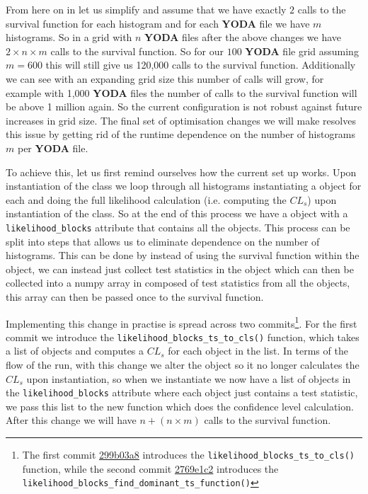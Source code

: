 From here on in let us simplify and assume that we have exactly $2$ calls to the survival function for each histogram and for each \textbf{YODA} file we have $m$ histograms. So in a grid with $n$ \textbf{YODA} files after the above changes we have $2\times n\times m$ calls to the survival function. So for our $100$ \textbf{YODA} file grid assuming $m=600$ this will still give us 120,000 calls to the survival function. Additionally we can see with an expanding grid size this number of calls will grow, for example with 1,000 \textbf{YODA} files the number of calls to the survival function will be above 1 million again. So the current configuration is not robust against future increases in grid size. The final set of optimisation changes we will make resolves this issue by getting rid of the runtime dependence on the number of histograms $m$ per \textbf{YODA} file.

To achieve this, let us first remind ourselves how the current set up works. Upon instantiation of the  class we loop through all histograms instantiating a  object for each and doing the full likelihood calculation (i.e. computing the $CL_s$) upon instantiation of the  class. So at the end of this process we have a  object with a \texttt{likelihood\_blocks} attribute that contains all the  objects. This process can be split into steps that allows us to eliminate dependence on the number of histograms. This can be done by instead of using the survival function within the  object, we can instead just collect test statistics in the  object which can then be collected into a numpy array in  composed of test statistics from all the   objects, this array can then be passed once to the survival function.

Implementing this change in practise is spread across two commits\footnote{The first commit \href{https://gitlab.com/hepcedar/contur/-/commit/299b03a86812b47e30ed66d4f82a59a3584cf523}{299b03a8} introduces the \texttt{likelihood\_blocks\_ts\_to\_cls()} function, while the second commit \href{https://gitlab.com/hepcedar/contur/-/commit/2769e1c2a020efd2de2919db2413309eef8a8e64}{2769e1c2} introduces the \texttt{likelihood\_blocks\_find\_dominant\_ts\_function()}}. For the first commit we introduce the \texttt{likelihood\_blocks\_ts\_to\_cls()} function, which takes a list of  objects and computes a $CL_s$ for each  object in the list. In terms of the flow of the run, with this change we alter the  object so it no longer calculates the $CL_s$ upon instantiation, so when we instantiate  we now have a list of  objects in the \texttt{likelihood\_blocks} attribute where each  object just contains a test statistic, we pass this list to the new function which does the confidence level calculation. After this change we will have $n + (n\times m)$ calls to the survival function.

